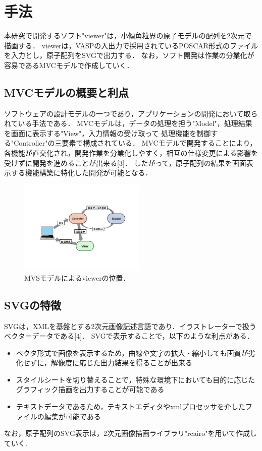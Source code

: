 
\section{手法}
本研究で開発するソフト"viewer"は，小傾角粒界の原子モデルの配列を2次元で描画する．
viewerは，VASPの入出力で採用されているPOSCAR形式のファイルを入力とし，原子配列をSVGで出力する．
なお，ソフト開発は作業の分業化が容易であるMVCモデルで作成していく．

\subsection{MVCモデルの概要と利点}
ソフトウェアの設計モデルの一つであり，アプリケーションの開発において取られている手法である．
MVCモデルは，データの処理を担う"Model"，処理結果を画面に表示する"View"，入力情報の受け取って
処理機能を制御する"Controller"の三要素で構成されている．
MVCモデルで開発することにより，各機能が直交化され，開発作業を分業化しやすく，相互の仕様変更による影響を受けずに開発を進めることが出来る[3]．
したがって，原子配列の結果を画面表示する機能構築に特化した開発が可能となる．

\begin{figure}[htbp]\begin{center}
\includegraphics[width=6cm,bb=0 0 442 500]{../figs/./boundary_narita.005.jpg}
\caption{MVSモデルによるviewerの位置．}
\label{default}\end{center}\end{figure}
\subsection{SVGの特徴}
SVGは，XMLを基盤とする2次元画像記述言語であり．イラストレーターで扱うベクターデータである[4]．
SVGで表示することで，以下のような利点がある．

\begin{itemize}
\item ベクタ形式で画像を表示するため，曲線や文字の拡大・縮小しても画質が劣化せずに，解像度に応じた出力結果を得ることが出来る
\item スタイルシートを切り替えることで，特殊な環境下においても目的に応じたグラフィック描画を出力することが可能である
\item テキストデータであるため，テキストエディタやxmlプロセッサを介したファイルの編集が可能である
\end{itemize}
なお，原子配列のSVG表示は，2次元画像描画ライブラリ"rcairo"を用いて作成していく.

